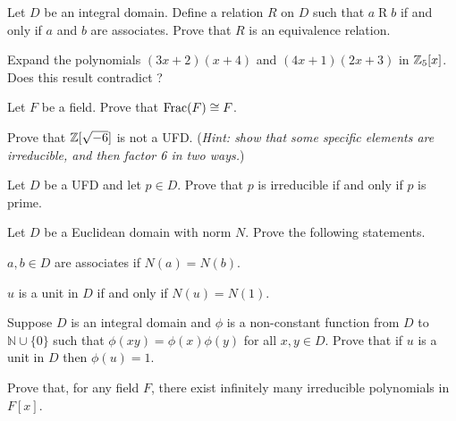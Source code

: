 \begin{problem}
    Let $D$ be an integral domain. Define a relation $R$ on $D$ such that $a\mathrel{R}b$ if and only if $a$ and $b$ are associates. Prove that $R$ is an equivalence relation.
\end{problem}

\begin{problem}
    Expand the polynomials $(3x+2)(x+4)$ and $(4x+1)(2x+3)$ in $\mathbb{Z}_5[x]$. Does this result contradict ?
\end{problem}

\begin{problem}
    Let $F$ be a field. Prove that $\mathrm{Frac}(F) \cong F$.
\end{problem}

\begin{problem}
    Prove that $\mathbb{Z}[\sqrt{-6}]$ is not a UFD.\newline
    (\textit{Hint: show that some specific elements are irreducible, and then factor 6 in two ways.})
\end{problem}

\begin{problem}
    Let $D$ be a UFD and let $p \in D$. Prove that $p$ is irreducible if and only if $p$ is prime.
\end{problem}

\begin{problem}
    Let $D$ be a Euclidean domain with norm $N$. Prove the following statements.
    \begin{partquestions}{\alph*}
        \item $a,b \in D$ are associates if $N(a) = N(b)$.
        \item $u$ is a unit in $D$ if and only if $N(u) = N(1)$.
    \end{partquestions}
\end{problem}

\begin{problem}
    Suppose $D$ is an integral domain and $\phi$ is a non-constant function from $D$ to $\mathbb{N} \cup \{0\}$ such that $\phi(xy) = \phi(x)\phi(y)$ for all $x,y\in D$. Prove that if $u$ is a unit in $D$ then $\phi(u) = 1$.
\end{problem}

\begin{problem}
    Prove that, for any field $F$, there exist infinitely many irreducible polynomials in $F[x]$.
\end{problem}

